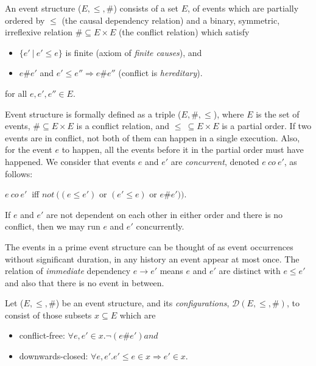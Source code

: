  \begin{definition}\label{def:event-structure}
    An event structure ($E, \leq, \#$) consists of a set $E$, of events which are partially ordered by $\leq$ (the causal dependency relation) and a binary, symmetric, irreflexive relation $\# \subseteq E \times E$ (the conflict relation) which satisfy
    
    \begin{itemize}
        \item $\{ e'\ |\ e' \leq e\}$ is finite (axiom of \emph{finite causes}), and
        \item $e \# e'$ and $ e' \leq e'' \Rightarrow e \# e''$ (conflict is \emph{hereditary}).
    \end{itemize}
    
    for all $e, e', e'' \in E$.
\end{definition}

Event structure is formally defined as a triple ($E, \#, \leq$), where $E$ is the set of events, $\# \subseteq E \times E$ is a conflict relation, and $\leq\ \subseteq E \times E$ is a partial order. If two events are in conflict, not both of them can happen in a single execution. Also, for the event $e$ to happen, all the events before it in the partial order must have happened. We consider that events $e$ and $e'$ are \emph{concurrent}, denoted $e\ co\ e'$, as follows:

    \begin{center}
        $e\ co\ e'\ $ iff $not\ ((e \leq e')$ or $(e' \leq e)$ or $e \# e'))$.
    \end{center}

If $e$ and $e'$ are not dependent on each other in either order and there is no conflict, then we may run $e$ and $e'$ concurrently.

The events in a prime event structure can be thought of as event occurrences without significant duration, in any history an event appear at most once. The relation of \emph{immediate} dependency $e \rightarrow e'$ means $e$ and $e'$ are distinct with $e \leq e'$ and also that there is no event in between.

 \begin{definition}\label{def:configurations-event-structure}
    Let ($E, \leq, \#$) be an event structure, and its \emph{configurations}, $\mathcal{D}(E, \leq, \#)$, to consist of those subsets $x \subseteq E$ which are
    
    \begin{itemize}
        \item conflict-free: $\forall e, e' \in x . \neg (e \# e') and$
        \item downwards-closed: $\forall e, e' . e' \leq e \in x \Rightarrow e' \in x$.
    \end{itemize}
\end{definition}

